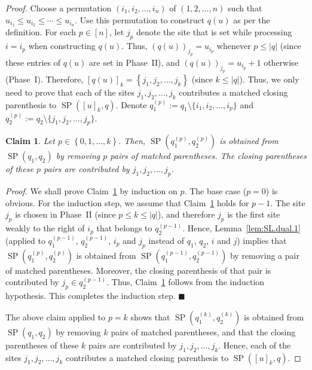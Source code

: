 \documentclass[reqno]{amsart}
\newcommand{\0}{\phantom{c}}
\DeclareMathOperator{\SP}{SP} %
\newenvironment{subproof}{\textit{Proof.} }{\hfill$\blacksquare$ \medskip}
\newcommand{\set}[1]{\left\{ #1 \right\}}
\newcommand{\abs}[1]{\left| #1 \right|}
\newcommand{\ive}[1]{\left[ #1 \right]}
\theoremstyle{plain}
\newtheorem{claim}[thm]{Claim}
\theoremstyle{definition}
\numberwithin{equation}{section}
\begin{document}
\begin{proof}
Choose a permutation $(i_1, i_2, \dotsc, i_n)$ of $(1, 2, \dotsc, n)$ such that $u_{i_1} \leq u_{i_2} \leq \cdots \leq u_{i_n}$.
Use this permutation to construct $q(u)$ as per the definition.
For each $p \in \ive{n}$, let $j_p$ denote the site that is set while processing $i = i_p$ when constructing $q(u)$.
Thus, $(q(u))_{j_p} = u_{i_p}$ whenever $p \leq \abs{q}$ (since these entries of $q(u)$ are set in Phase~II),
and $(q(u))_{j_p} = u_{i_p} + 1$ otherwise (Phase~I).
Therefore, $\ive{q(u)}_k = \set{j_1, j_2, \ldots, j_k}$ (since $k \leq \abs{q}$).
Thus, we only need to prove that each of the sites $j_1, j_2, \ldots, j_k$ contributes a matched closing parenthesis to $\SP(\ive{u}_k, q)$.
Denote $q_1^{(p)} := q_1 \setminus \{i_1, i_2, \dotsc, i_p\}$ and $q_2^{(p)} := q_2 \setminus \{j_1, j_2, \dotsc, j_p\}$.

\begin{claim}
\label{claim:matching_SP}
Let $p \in \set{0, 1, \ldots, k}$.
Then, $\SP(q_1^{(p)}, q_2^{(p)})$ is obtained from $\SP(q_1 , q_2)$ by removing $p$ pairs of matched parentheses.
The closing parentheses of these $p$ pairs are contributed by $j_1, j_2, \ldots, j_p$.
\end{claim}

\begin{subproof}
We shall prove Claim~\ref{claim:matching_SP} by induction on $p$.
The base case ($p = 0$) is obvious.
For the induction step, we assume that Claim~\ref{claim:matching_SP} holds for $p-1$.
The site $j_p$ is chosen in Phase~II (since $p \leq k \leq \abs{q}$), and therefore $j_p$ is the first site weakly to the right of $i_p$ that belongs to $q_2^{(p-1)}$.
Hence, Lemma~\ref{lem:SL.dual.1}
(applied to $q_1^{(p-1)}$, $q_2^{(p-1)}$, $i_p$ and $j_p$ instead of $q_1$, $q_2$, $i$ and $j$)
implies that $\SP(q_1^{(p)}, q_2^{(p)})$ is obtained from $\SP(q_1^{(p-1)}, q_2^{(p-1)})$ by removing a pair of matched parentheses.
Moreover, the closing parenthesis of that pair is contributed by $j_p \in q_2^{(p-1)}$.
Thus, Claim~\ref{claim:matching_SP} follows from the induction hypothesis.
This completes the induction step.
\end{subproof}

The above claim applied to $p = k$ shows that $\SP(q_1^{(k)}, q_2^{(k)})$ is obtained from $\SP(q_1 , q_2)$ by removing $k$ pairs of matched parentheses, and that the closing parentheses of these $k$ pairs are contributed by $j_1, j_2, \ldots, j_k$.
Hence, each of the sites $j_1, j_2, \ldots, j_k$ contributes a matched closing parenthesis to $\SP(\ive{u}_k, q)$.
\end{proof}
\end{document}
